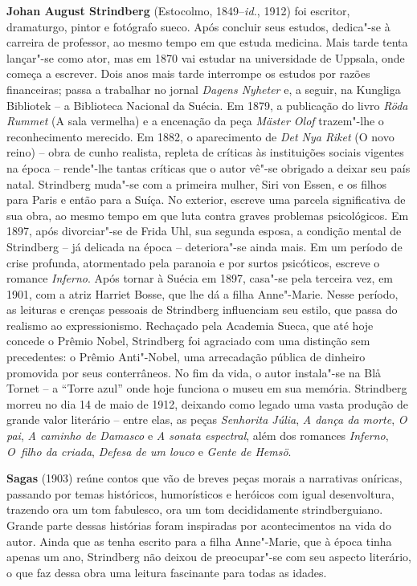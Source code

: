 \textbf{Johan August Strindberg} (Estocolmo, 1849--\textit{id.}, 1912) 
foi escritor, dramaturgo, pintor e fotógrafo sueco. Após concluir
seus estudos, dedica"-se à carreira de professor, ao mesmo tempo em que
estuda medicina. Mais tarde tenta lançar"-se como ator, mas em 1870 vai
estudar na universidade de Uppsala, onde começa a escrever. Dois anos
mais tarde interrompe os estudos por razões financeiras; passa a
trabalhar no jornal \textit{Dagens Nyheter} e, a seguir, na
Kungliga Bibliotek -- a Biblioteca Nacional da Suécia.
Em 1879, a publicação do livro \textit{Röda Rummet} (A sala vermelha) e
a encenação da peça \textit{Mäster Olof} trazem"-lhe o reconhecimento
merecido. Em 1882, o aparecimento de \textit{Det Nya Riket} (O novo
reino) -- obra de cunho realista, repleta de críticas às instituições
sociais vigentes na época -- rende"-lhe tantas críticas que o autor vê"-se
obrigado a deixar seu país natal. Strindberg muda"-se com a primeira
mulher, Siri von Essen, e os filhos para Paris e então para a Suíça. No
exterior, escreve uma parcela significativa de sua obra, ao mesmo tempo
em que luta contra graves problemas psicológicos. Em 1897, após
divorciar"-se de Frida Uhl, sua segunda esposa, a condição mental de
Strindberg -- já delicada na época -- deteriora"-se ainda mais. Em um
período de crise profunda, atormentado pela paranoia e por surtos
psicóticos, escreve o romance \textit{Inferno}. Após tornar à Suécia em
1897, casa"-se pela terceira vez, em 1901, com a atriz Harriet Bosse,
que lhe dá a filha Anne"-Marie. Nesse período, as leituras e crenças
pessoais de Strindberg influenciam seu estilo, que passa do realismo ao
expressionismo. Rechaçado pela Academia Sueca, que até 
hoje concede o Prêmio Nobel, Strindberg foi agraciado com uma 
distinção sem precedentes: o Prêmio Anti"-Nobel, uma arrecadação 
pública de dinheiro promovida por seus conterrâneos. 
No fim da vida, o autor instala"-se na Blå Tornet -- a “Torre azul” 
onde hoje funciona o museu em sua memória.
Strindberg morreu no dia 14 de maio de 1912, deixando como legado uma
vasta produção de grande valor literário -- entre elas, as peças
\textit{Senhorita Júlia}, \textit{A dança da morte}, \textit{O pai},
\textit{A caminho de Damasco} e \textit{A sonata espectral}, além dos
romances \textit{Inferno}, \textit{O~filho da criada}, \textit{Defesa
de um louco} e \textit{Gente de Hemsö}.

\textbf{Sagas} (1903) reúne contos que vão de breves peças morais a narrativas oníricas, 
passando por temas históricos, humorísticos e heróicos com igual desenvoltura, trazendo 
ora um tom fabulesco, ora um tom decididamente strindberguiano. Grande parte dessas histórias 
foram inspiradas por acontecimentos na vida do autor. Ainda que as tenha escrito para a filha Anne{}"-Marie, 
que à época tinha apenas um ano, Strindberg não deixou de preocupar{}"-se com seu aspecto literário, 
o que faz dessa obra uma leitura fascinante para todas as idades.

